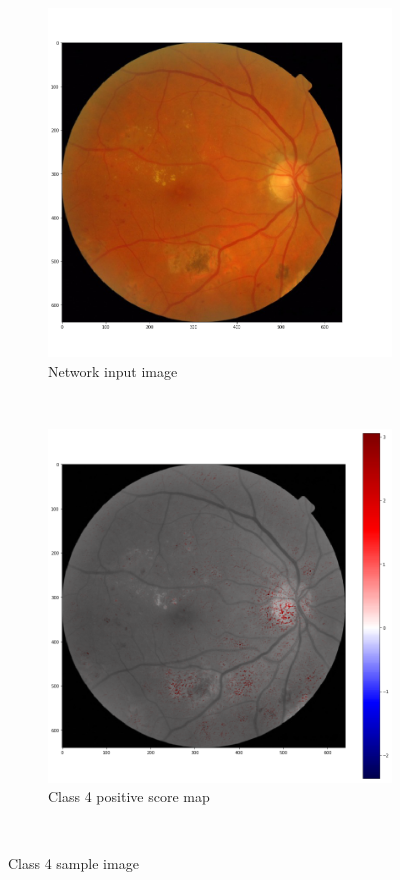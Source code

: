 \begin{figure}[ht]
	\centering
	\begin{subfigure}{0.4\textwidth}
		\includegraphics[width=\textwidth]{Figures/chapter_interpretation/figures/maps/retina.png}
		\caption{Network input image}
		\label{score:fig:retine_sample}
	\end{subfigure}
	~ %
	\begin{subfigure}{0.4\textwidth}
		\includegraphics[width=\textwidth]{Figures/chapter_interpretation/figures/maps/inputc.png}
		\caption{Class 4 positive score map}
		\label{score:fig:retine_sample_score_map}
	\end{subfigure}\\
	\caption{Class 4 sample image}	
	\label{score:fig:retine_test}
\end{figure}

